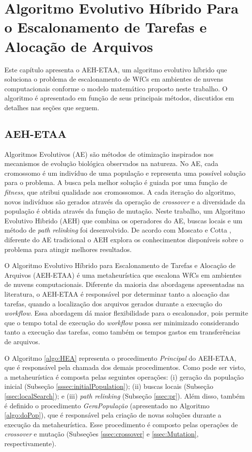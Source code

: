\chapter{Algoritmo Evolutivo Híbrido Para o Escalonamento de Tarefas e Alocação de Arquivos}\label{chap5}

Este capítulo apresenta o AEH-ETAA, um algoritmo evolutivo híbrido que soluciona o problema de escalonamento de WfCs em ambientes de nuvens computacionais conforme o modelo matemático proposto neste trabalho. O algoritmo é apresentado  em função de seus principais métodos, discutidos em detalhes nas seções que seguem.



\section{AEH-ETAA}

Algoritmos Evolutivos (AE) \cite{Moraglio2012} são métodos de otimização inspirados nos mecanismos de evolução biológica observados na natureza. No AE, cada cromossomo é um indivíduo de uma população e representa uma possível solução para o problema. A busca pela melhor solução é guiada por uma função de \textit{fitness}, que atribui qualidade aos cromossomos. A cada iteração do algoritmo, novos indivíduos são gerados através da operação de \textit{crossover} e a diversidade da população é obtida através da função de mutação. Neste trabalho, um Algoritmo Evolutivo Hibrido (AEH) que combina os operadores do AE,  buscas locais e um método de \textit{path relinking} \cite{Reeves1998} foi desenvolvido. De acordo com Moscato e Cotta \cite{Moscato2010}, diferente do AE tradicional o AEH explora os conhecimentos disponíveis sobre o problema para atingir melhores resultados.

O Algoritmo Evolutivo Híbrido para Escalonamento de Tarefas e Alocação de Arquivos (AEH-ETAA) é uma metaheurística que escalona WfCs em ambientes de nuvens computacionais. Diferente da maioria das abordagens apresentadas na literatura, o AEH-ETAA é responsável por determinar tanto a alocação das tarefas, quando a localização dos arquivos gerados durante a execução do \textit{workflow}. Essa abordagem dá maior flexibilidade para o escalonador, pois permite que o tempo total de execução do \textit{workflow} possa ser minimizado considerando tanto a execução das tarefas, como também os tempos gastos em transferências de arquivos. 

O Algoritmo \ref{algo:HEA} representa o procedimento \textit{Principal} do AEH-ETAA, que é responsável pela chamada dos demais procedimentos. Como pode ser visto, a metaheurística é composta pelas seguintes operações: (i) geração da população inicial (Subseção \ref{sssec:initialPopulation}); (ii) buscas locais (Subseção \ref{ssec:localSearch});  e  (iii) \textit{path relinking} (Subseção \ref{ssec:pr}). Além disso, também é definido o procedimento \textit{GeraPopulação} (apresentado no Algoritmo \ref{algo:doPop}), que é responsável pela criação de novas soluções durante a execução da metaheurística. Esse procedimento é composto pelas operações de \textit{crossover} e mutação (Subseções \ref{ssec:crossover} e \ref{ssec:Mutation}, respectivamente).


